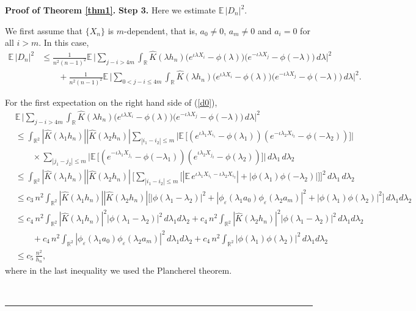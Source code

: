 \documentclass[11pt]{article}
\newenvironment{proof}[1][Proof]{\textbf{#1.} }{\
\rule{0.5em}{0.5em}}
\def\R{{\mathbb R}}
\def\E{{{\mathbb E}\,}}
\begin{document}
\begin{proof}[Proof of Theorem \ref{thm1}]
\medskip \noindent
\textbf{Step 3.} Here we estimate $\E|D_n|^2$.  

We first assume that $\{X_n\}$ is $m$-dependent, that is, $a_{0}\neq 0$, $a_{m}\neq 0$ and $a_i=0$ for all $i>m$. In this case,
\begin{align} \label{d0}
\E |D_n|^2
&\leq \frac{1}{n^2(n-1)^2}\E\Big|\sum_{j-i>4m}\int_{\R} \widehat{K}(\lambda h_n)\big(e^{\iota \lambda  X_i}-\phi(\lambda)\big)\big(e^{-\iota \lambda  X_j}-\phi(-\lambda)\big) \, d\lambda\Big|^2 \nonumber \\  
&\qquad+\frac{1}{n^2(n-1)^2}\E \Big|\sum_{0<j-i\leq 4m}\int_{\R} \widehat{K}(\lambda h_n)\big(e^{\iota \lambda X_i}- \phi(\lambda)\big)\big(e^{-\iota \lambda  X_j}-\phi(-\lambda)\big) \, d\lambda\Big|^2.  
\end{align}

For the first expectation on the right hand side of (\ref{d0}),
\begin{align} \label{d1}
&\E \Big|\sum_{j-i>4m}\int_{\R} \widehat{K}(\lambda h_n)\big(e^{\iota \lambda  X_i}-\phi(\lambda)\big)\big(e^{-\iota \lambda X_j}-\phi(-\lambda)\big) \, d\lambda\Big|^2 \nonumber \\
&\leq \int_{\R^2} |\widehat{K}(\lambda_1 h_n)| |\widehat{K}(\lambda_2 h_n)|  \sum_{|i_1-i_2|\leq m} \Big|\E \big[(e^{\iota \lambda_1  X_{i_1}}-\phi(\lambda_1))(e^{-\iota \lambda_2  X_{i_2}}-\phi(-\lambda_2))\big] \Big| \nonumber \\
&\qquad\times  \sum_{|j_1-j_2|\leq m} \Big|\E \big[(e^{-\iota \lambda_1  X_{j_1}}-\phi(-\lambda_1))(e^{\iota \lambda_2  X_{j_2}}-\phi(\lambda_2))\big]\Big|\, d\lambda_1\, d\lambda_2 \nonumber \\
&\leq\int_{\R^2} |\widehat{K}(\lambda_1 h_n)||\widehat{K}(\lambda_2 h_n)|\, \Big[\sum_{|i_1-i_2|\leq m}\big[|\E e^{\iota \lambda_1  X_{i_1}-\iota \lambda_2 X_{i_2}}|+|\phi(\lambda_1)\phi(-\lambda_2)|\big]\Big]^2\, d\lambda_1\, d\lambda_2 \nonumber \\
&\leq c_3\, n^2\int_{\R^2} |\widehat{K}(\lambda_1h_n)||\widehat{K}(\lambda_2 h_n)|\Big[ |\phi(\lambda_1-\lambda_2)|^2+|\phi_{\varepsilon}(\lambda_1 a_0)\phi_{\varepsilon}(\lambda_2 a_m)|^2+|\phi(\lambda_1)\phi(\lambda_2)|^2\Big]\, d\lambda_1d\lambda_2 \nonumber \\
&\leq c_4\, n^2\int_{\R^2} |\widehat{K}(\lambda_1h_n)|^2 |\phi(\lambda_1-\lambda_2)|^2\, d\lambda_1d\lambda_2+c_4\, n^2\int_{\R^2}  |\widehat{K}(\lambda_2 h_n)|^2 |\phi(\lambda_1-\lambda_2)|^2\, d\lambda_1d\lambda_2 \nonumber \\ 
&\qquad+c_4\, n^2\int_{\R^2}  |\phi_{\varepsilon}(\lambda_1 a_0)\phi_{\varepsilon}(\lambda_2 a_m)|^2\, d\lambda_1d\lambda_2+c_4\, n^2\int_{\R^2}  |\phi(\lambda_1)\phi(\lambda_2)|^2\, d\lambda_1d\lambda_2 \nonumber \\
&\leq c_5\, \frac{n^2}{h_n},
\end{align}
where in the last inequality we used the Plancherel theorem.


\end{proof}
\end{document}
